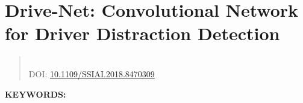 \renewcommand{\figurepath}[1]{Chapters/drive_net/figures/#1}

\chapter{Drive-Net: Convolutional Network for Driver Distraction Detection}\label{ch:drive-net}

\begin{quotation}
    \centering
     \\
    DOI\@: \href{https://ieeexplore.ieee.org/document/8470309}{10.1109/SSIAI.2018.8470309}
\end{quotation}

%

\textbf{KEYWORDS:\ } %

\newpage

